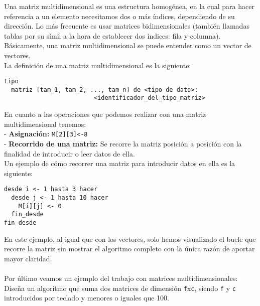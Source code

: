 \documentclass[12pt,letterpaper]{article}
\begin{document}
Una matriz multidimensional es una estructura homogénea, en la cual para hacer referencia a un elemento necesitamos dos o más índices, dependiendo de su dirección. Lo más frecuente es usar matrices bidimensionales (también llamadas tablas por su símil a la hora de establecer dos índices: fila y columna).\\
Básicamente, una matriz multidimensional se puede entender como un vector de vectores.\\
La definición de una matriz multidimensional es la siguiente:
\begin{lstlisting}
tipo
  matriz [tam_1, tam_2, ..., tam_n] de <tipo de dato>:
                         <identificador_del_tipo_matriz>
\end{lstlisting}
En cuanto a las operaciones que podemos realizar con una matriz multidimensional tenemos:\\
- \textbf{Asignación:} \texttt{M[2][3]<-8}\\
- \textbf{Recorrido de una matriz:} Se recorre la matriz posición a posición con la finalidad de introducir o leer datos de ella.\\
Un ejemplo de cómo recorrer una matriz para introducir datos en ella es la siguiente:
\begin{lstlisting}
desde i <- 1 hasta 3 hacer
  desde j <- 1 hasta 10 hacer
    M[i][j] <- 0
  fin_desde
fin_desde
\end{lstlisting}
En este ejemplo, al igual que con los vectores, solo hemos visualizado el bucle que recorre la matriz sin mostrar el algoritmo completo con la única razón de aportar mayor claridad.\\\\
Por último veamos un ejemplo del trabajo con matrices multidimensionales:\\
Diseña un algoritmo que suma dos matrices de dimensión \texttt{f}x\texttt{c}, siendo \texttt{f} y \texttt{c} introducidos por teclado y menores o iguales que 100.
\end{document}
